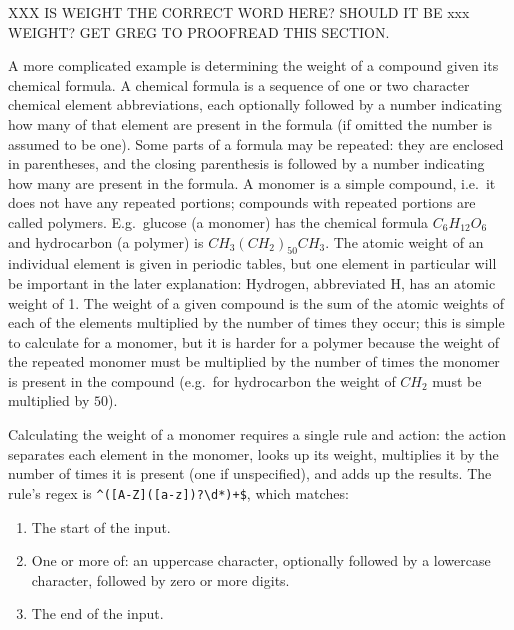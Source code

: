XXX IS WEIGHT THE CORRECT WORD HERE\@?  SHOULD IT BE xxx WEIGHT\@?  GET
GREG TO PROOFREAD THIS SECTION\@.

A more complicated example is determining the weight of a compound given
its chemical formula.  A chemical formula is a sequence of one or two
character chemical element abbreviations, each optionally followed by a
number indicating how many of that element are present in the formula (if
omitted the number is assumed to be one).  Some parts of a formula may be
repeated: they are enclosed in parentheses, and the closing parenthesis is
followed by a number indicating how many are present in the formula.  A
monomer is a simple compound, i.e.\ it does not have any repeated portions;
compounds with repeated portions are called polymers.  E.g.\ glucose (a
monomer) has the chemical formula $C_{6}H_{12}O_{6}$ and hydrocarbon (a
polymer) is $CH_{3}{(CH_{2})}_{50}CH_{3}$.  The atomic weight of an
individual element is given in periodic tables, but one element in
particular will be important in the later explanation: Hydrogen,
abbreviated H, has an atomic weight of 1.  The weight of a given compound
is the sum of the atomic weights of each of the elements multiplied by the
number of times they occur; this is simple to calculate for a monomer, but
it is harder for a polymer because the weight of the repeated monomer must
be multiplied by the number of times the monomer is present in the compound
(e.g.\ for hydrocarbon the weight of $CH_{2}$ must be multiplied by $50$).

Calculating the weight of a monomer requires a single rule and action: the
action separates each element in the monomer, looks up its weight,
multiplies it by the number of times it is present (one if unspecified),
and adds up the results.  The rule's regex is \verb!^([A-Z]([a-z])?\d*)+$!,
which matches:

\begin{enumerate}

    \squeezeitems{}

    \item The start of the input.

    \item One or more of: an uppercase character, optionally followed by a
        lowercase character, followed by zero or more digits.

    \item The end of the input.

\end{enumerate}

